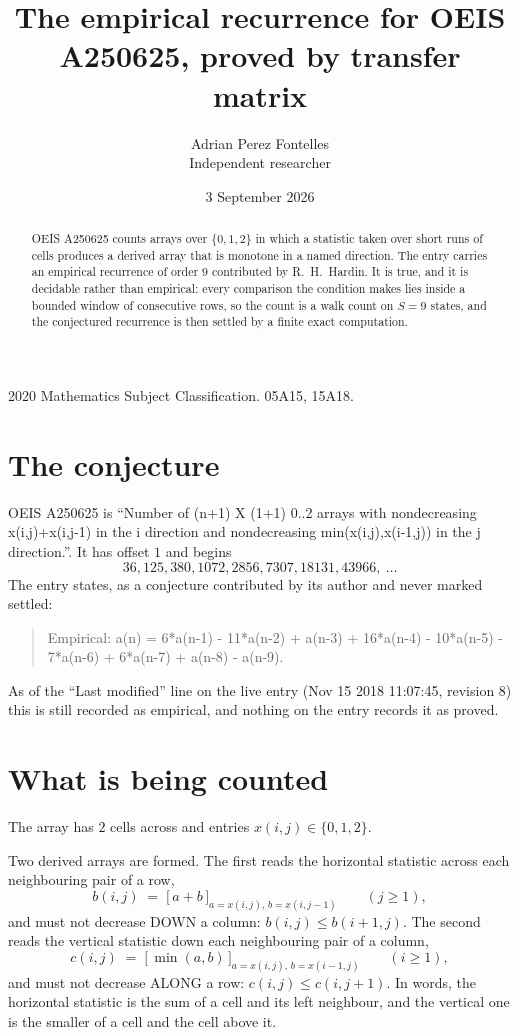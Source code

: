 \documentclass[11pt,a4paper]{article}
\title{The empirical recurrence for OEIS A250625, proved by transfer matrix}
\author{Adrian Perez Fontelles\\ \small Independent researcher}
\date{3 September 2026}
\theoremstyle{plain}
\theoremstyle{definition}
\begin{document}
\maketitle

\begin{abstract}
OEIS A250625 counts arrays over $\{0,1,2\}$ in which a statistic taken over short runs
of cells produces a derived array that is monotone in a named direction. The entry carries an
empirical recurrence of order $9$ contributed by R.~H.~Hardin. It is true, and it is
decidable rather than empirical: every comparison the condition makes lies inside a bounded
window of consecutive rows, so the count is a walk count on $S=9$ states, and the
conjectured recurrence is then settled by a finite exact computation.
\end{abstract}

\noindent\small 2020 Mathematics Subject Classification. 05A15, 15A18.\normalsize

\section{The conjecture}

OEIS A250625 is ``Number of (n+1) X (1+1) 0..2 arrays with nondecreasing x(i,j)+x(i,j-1) in the i direction and nondecreasing min(x(i,j),x(i-1,j)) in the j direction.''. It has offset $1$ and begins
\[
36, 125, 380, 1072, 2856, 7307, 18131, 43966,\ \dots
\]
The entry states, as a conjecture contributed by its author and never marked settled:
\begin{quote}
Empirical: a(n) = 6*a(n-1) - 11*a(n-2) + a(n-3) + 16*a(n-4) - 10*a(n-5) - 7*a(n-6) + 6*a(n-7) + a(n-8) - a(n-9).
\end{quote}
As of the ``Last modified'' line on the live entry (Nov 15 2018 11:07:45, revision 8) this is still
recorded as empirical, and nothing on the entry records it as proved.

\section{What is being counted}

The array has $2$ cells across and entries $x(i,j)\in\{0,1,2\}$.

Two derived arrays are formed. The first reads the horizontal statistic across each
neighbouring pair of a row,
\[
b(i,j)\;=\;\bigl[\,a+b\,\bigr]_{a=x(i,j),\,b=x(i,j-1)}\qquad (j\ge1),
\]
and must not decrease DOWN a column: $b(i,j)\le b(i{+}1,j)$. The second reads the vertical
statistic down each neighbouring pair of a column,
\[
c(i,j)\;=\;\bigl[\,\min(a,b)\,\bigr]_{a=x(i,j),\,b=x(i{-}1,j)}\qquad (i\ge1),
\]
and must not decrease ALONG a row: $c(i,j)\le c(i,j{+}1)$. In words, the horizontal statistic
is the sum of a cell and its left neighbour, and the vertical one is
the smaller of a cell and the cell above it.
\end{document}
